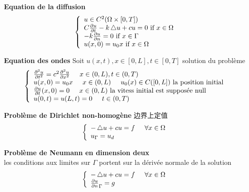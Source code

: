 \documentclass{article}
\begin{document}
\textbf{Equation de la diffusion}
\begin{equation}
\left\{
  \begin{array}{ll}
		  u \in C^2(\Omega \times [0,T]) \\
		  C \frac{\partial  u}{\partial t} - k \mathop{}\!\mathbin\bigtriangleup u + cu =0 \textrm{\ if } x \in \Omega \\
		  -k \frac{\partial u}{\partial n} = 0 \textrm{\ if } x \in \Gamma \\
		  u(x,0) = u_0{x} \textrm{\ if } x \in \Omega\\
  \end{array}
\right.
\end{equation}
\bigskip

\textbf{Equation des ondes}
Soit $u(x,t), x \in [0,L], t \in [0,T] $ solution du probl\`eme
\begin{equation}
\left\{
  \begin{array}{ll}
		  \frac{\partial^2  u}{\partial t^2} = c^2 \frac{\partial^2 u}{\partial x^2 } \eqspace  x \in (0,L), t \in (0,T) \\
		  u(x,0) = u_0{x} \eqspace x \in (0,L) \eqspace u_0(x)\in C([0,L])\  \text{la position initial}\\
		  \frac{\partial  u}{\partial t}(x,0) = 0 \eqspace x \in (0,L)\ \text{la vitess initial est suppos\'ee null}\\
		  u(0,t) = u(L,t) = 0 \eqspace t \in (0,T)
  \end{array}
\right.
\end{equation}
\bigskip

\textbf{Probl\`eme de Dirichlet non-homog\`ene}
边界上定值\\
\begin{equation}
\left\{
  \begin{array}{ll}
		 -\mathop{}\!\mathbin\bigtriangleup u + cu = f \hspace{0.5cm} \forall x \in \Omega \\
		 u_{\Gamma} = u_d
  \end{array}
\right.
\end{equation}
\bigskip

\textbf{Probl\`eme de Neumann en dimension deux}\\
les conditions aux limites sur $\Gamma$ portent sur la d\'eriv\'ee normale de la solution\\
\begin{equation}
\left\{
  \begin{array}{ll}
		 -\mathop{}\!\mathbin\bigtriangleup u + cu = f \hspace{0.5cm} \forall x \in \Omega \\
		 \frac{\partial u}{\partial n}_{\Gamma} = g
  \end{array}
\right.
\end{equation}
\bigskip
\end{document}
